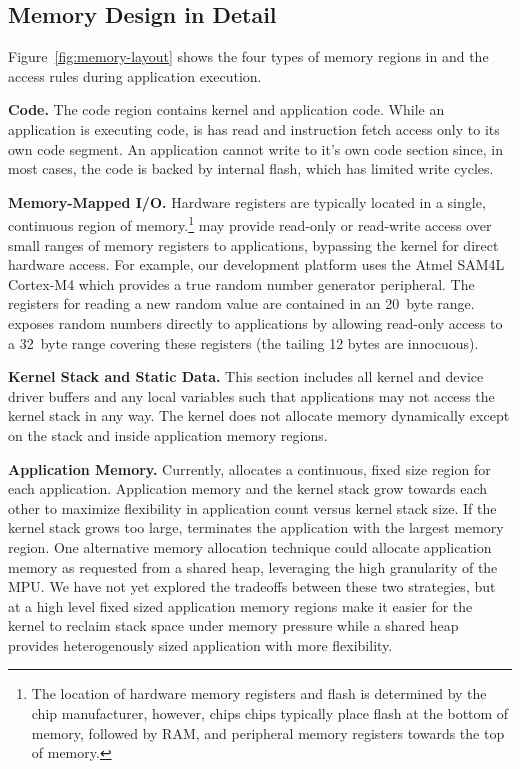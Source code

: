 \subsection{\name Memory Design in Detail}

Figure~\ref{fig:memory-layout} shows the four types of memory regions in \name
and the access rules during application execution.

{\bf Code.}
The code region contains kernel and application code.  While an application is
executing code, is has read and instruction fetch access only to its own code
segment.  An application cannot write to it's own code section since, in most
cases, the code is backed by internal flash, which has limited write cycles.

{\bf Memory-Mapped I/O.}
Hardware registers are typically located in a single, continuous region of
memory.\footnote{The location of hardware memory registers and flash is
  determined by the chip manufacturer, however, chips chips typically place
  flash at the bottom of memory, followed by RAM, and peripheral memory
registers towards the top of memory.}
\name may provide read-only or read-write access over small ranges of memory
registers to applications, bypassing the kernel for direct hardware access.
For example, our development platform uses the Atmel SAM4L Cortex-M4 which
provides a true random number generator peripheral. The registers for reading
a new random value are contained in an 20~byte range.  \name exposes random
numbers directly to applications by allowing read-only access to a 32~byte
range covering these registers (the tailing 12 bytes are innocuous).

{\bf Kernel Stack and Static Data.}
This section includes all kernel and device driver buffers and any local
variables such that applications may not access the kernel stack in any way.
The kernel does not allocate memory dynamically except on the stack and inside
application memory regions.

{\bf Application Memory.}
Currently, \name allocates a continuous, fixed size region for each
application.
Application memory and the kernel stack grow towards each other to maximize
flexibility in application count versus kernel stack size. If the kernel stack
grows too large, \name terminates the application with the
largest memory region. One alternative memory allocation technique could
allocate application memory as requested from a shared heap, leveraging the
high granularity of the MPU. We have not yet explored the tradeoffs between
these two strategies, but at a high level fixed sized application memory
regions make it easier for the kernel to reclaim stack space under memory
pressure while a shared heap provides heterogenously sized application with
more flexibility.


